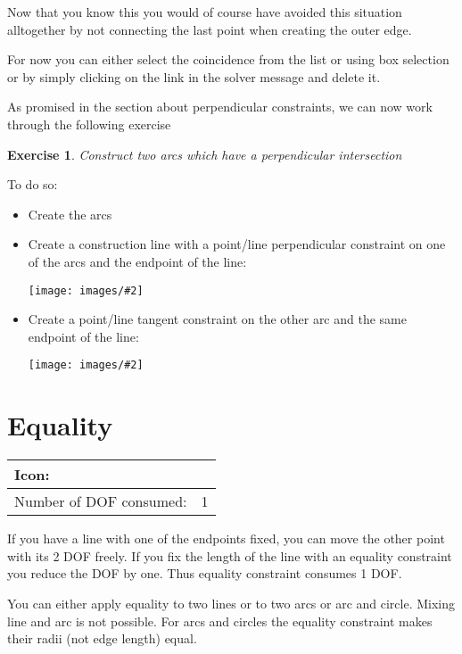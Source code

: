 \documentclass[12pt,titlepage]{article}
\newcommand{\icon}[1]{\raisebox{-1em}{\rule{0pt}{27pt}\texttt{[image: images/\#1]}}}
\newcommand{\img}[2]{\vspace{2ex}\noindent\texttt{[image: images/\#2]}}
\newcommand{\dofConsumed}{Number of DOF consumed:}
\newtheorem{Exercise}{Exercise}
\begin{document}
Now that you know this you would of course have avoided this situation
alltogether by not connecting the last point when creating the outer edge.

For now you can either select the coincidence from the list or using box selection or
by simply clicking on the link in the solver message and delete it.

As promised in the section about perpendicular constraints, we can now
work through the following exercise

\begin{Exercise}
\label{ExercisePerpendicularArcs}
Construct two arcs which have a perpendicular intersection
\end{Exercise}

To do so:
\begin{itemize}
\item Create the arcs
\item Create a construction line with a point/line perpendicular
      constraint on one of the arcs and the endpoint of the line:

      \img{}{PerpendicularCurveCurve1}
\item Create a point/line tangent constraint on the other arc and the
      same endpoint of the line:

      \img{}{PerpendicularCurveCurve2}
\end{itemize}

\section{Equality}
\begin{tabular}{|l|l|}
\hline
Icon: & \icon{Constraint_EqualLength}\\
\hline
\dofConsumed & 1 \\
\hline
\end{tabular}

If you have a line with one of the endpoints fixed, you can move the other point
with its 2 DOF freely. If you fix the length of the line with an equality constraint
you reduce the DOF by one. Thus equality constraint consumes 1 DOF.

You can either apply equality to two lines or to two arcs or arc and circle.
Mixing line and arc is not possible. For arcs and circles the equality
constraint makes their radii (not edge length) equal.
\end{document}
